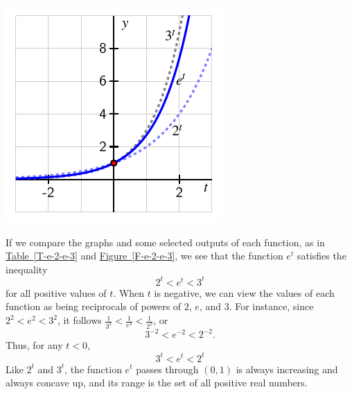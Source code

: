 \documentclass[nooutcomes]{ximera}
\begin{document}

\begin{image}
\includegraphics{e-2-e-3}
\end{image}

If we compare the graphs and some selected outputs of each function, as in \hyperref[T-e-2-e-3]{Table~\ref{T-e-2-e-3}} and \hyperref[F-e-2-e-3]{Figure~\ref{F-e-2-e-3}}, we see that the function \(e^t\) satisfies the inequality%
\begin{equation*}
2^t \lt e^t \lt 3^t
\end{equation*}
for all positive values of \(t\).  When \(t\) is negative, we can view the values of each function as being reciprocals of powers of \(2\), \(e\), and \(3\).  For instance, since \(2^2 \lt e^2 \lt 3^2\), it follows \(\frac{1}{3^2} \lt \frac{1}{e^2} \lt \frac{1}{2^2}\), or%
\begin{equation*}
3^{-2} \lt e^{-2} \lt 2^{-2}\text{.}
\end{equation*}
Thus, for any \(t \lt 0\),%
\begin{equation*}
3^t \lt e^t \lt 2^t
\end{equation*}
Like \(2^t\) and \(3^t\), the function \(e^t\) passes through \((0,1)\) is always increasing and always concave up, and its range is the set of all positive real numbers.
\end{document}
